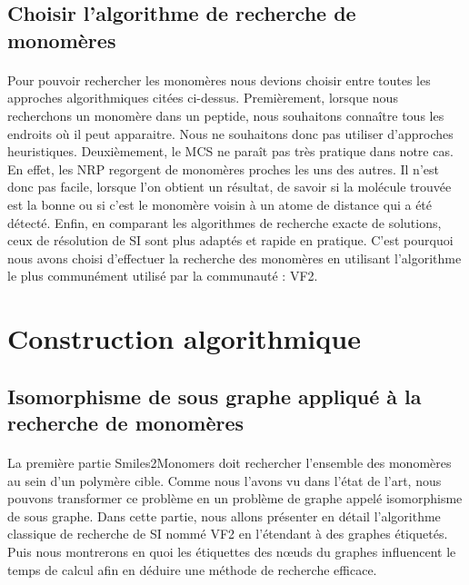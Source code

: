 \documentclass[12pt,french,twoside]{report}
\begin{document}
\subsection{Choisir l'algorithme de recherche de monomères}

\paragraph{}Pour pouvoir rechercher les monomères nous devions choisir entre toutes les approches algorithmiques citées ci-dessus.
Premièrement, lorsque nous recherchons un monomère dans un peptide, nous souhaitons connaître tous les endroits où il peut apparaitre.
Nous ne souhaitons donc pas utiliser d'approches heuristiques.
Deuxièmement, le MCS ne paraît pas très pratique dans notre cas.
En effet, les NRP regorgent de monomères proches les uns des autres.
Il n'est donc pas facile, lorsque l'on obtient un résultat, de savoir si la molécule trouvée est la bonne ou si c'est le monomère voisin à un atome de distance qui a été détecté.
Enfin, en comparant les algorithmes de recherche exacte de solutions, ceux de résolution de SI sont plus adaptés et rapide en pratique.
C'est pourquoi nous avons choisi d'effectuer la recherche des monomères en utilisant l'algorithme le plus communément utilisé par la communauté : VF2.




\section{Construction algorithmique}

\subsection{Isomorphisme de sous graphe appliqué à la recherche de monomères}

\label{isomorphisme_p}

\paragraph{}La première partie Smiles2Monomers doit rechercher l'ensemble des monomères au sein d'un polymère cible.
Comme nous l'avons vu dans l'état de l'art, nous pouvons transformer ce problème en un problème de graphe appelé isomorphisme de sous graphe.
Dans cette partie, nous allons présenter en détail l'algorithme classique de recherche de SI nommé VF2 en l'étendant à des graphes étiquetés.
Puis nous montrerons en quoi les étiquettes des n\oe{}uds du graphes influencent le temps de calcul afin en déduire une méthode de recherche efficace.
\end{document}
